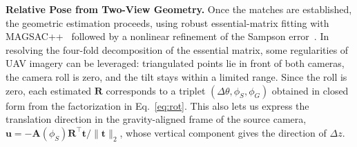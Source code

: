 \noindent\textbf{Relative Pose from Two-View Geometry.}
Once the matches are established, the geometric estimation proceeds, using robust essential-matrix fitting with MAGSAC++~\citep{barath2020magsacpp} followed by a nonlinear refinement of the Sampson error~\citep{hartley2003multiple}. In resolving the four-fold decomposition of the essential matrix, some regularities of UAV imagery can be leveraged: triangulated points lie in front of both cameras, the camera roll is zero, and the tilt stays within a limited range. Since the roll is zero, each estimated $\mathbf{R}$ corresponds to a triplet $(\Delta\theta,\phi_S,\phi_G)$ obtained in closed form from the factorization in Eq.~\eqref{eq:rot}. This also lets us express the translation direction in the gravity-aligned frame of the source camera, $\mathbf{u}=-\mathbf{A}(\phi_S)\mathbf{R}^\top\mathbf{t}/\lVert\mathbf{t}\rVert_2$, whose vertical component gives the direction of $\Delta z$.

